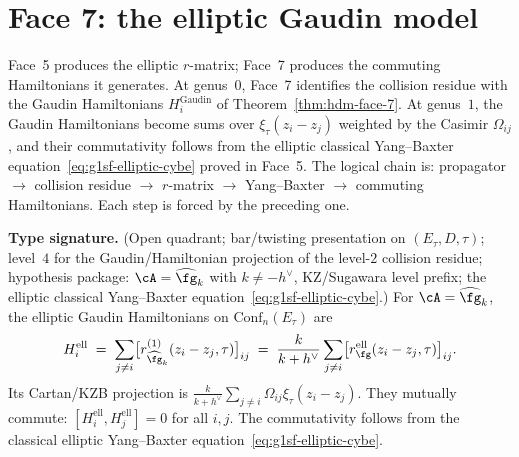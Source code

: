 
\section{Face 7: the elliptic Gaudin model}
\label{sec:g1sf-face-7}

Face~5 produces the elliptic $r$-matrix; Face~7 produces the
commuting Hamiltonians it generates. At genus~$0$, Face~7 identifies
the collision residue with the Gaudin Hamiltonians
$H_i^{\mathrm{Gaudin}}$ of Theorem~\ref{thm:hdm-face-7}. At
genus~$1$, the Gaudin Hamiltonians become sums over
$\xi_\tau(z_i - z_j)$ weighted by the Casimir $\Omega_{ij}$, and
their commutativity follows from the elliptic classical Yang--Baxter
equation~\eqref{eq:g1sf-elliptic-cybe} proved in Face~5. The logical
chain is: propagator $\to$ collision residue $\to$ $r$-matrix $\to$
Yang--Baxter $\to$ commuting Hamiltonians. Each step is forced by the
preceding one.

\begin{theorem}
\label{thm:g1sf-face-7}
\textbf{Type signature.} (Open quadrant; bar/twisting presentation on
$(E_\tau, D, \tau)$; level~$4$ for the Gaudin/Hamiltonian projection
of the level-$2$ collision residue; hypothesis package:
$\cA = \widehat{\fg}_k$ with $k\neq -h^\vee$,
KZ/Sugawara level prefix; the elliptic classical Yang--Baxter
equation~\eqref{eq:g1sf-elliptic-cybe}.)
For $\cA = \widehat{\fg}_k$, the elliptic Gaudin Hamiltonians on
$\mathrm{Conf}_n(E_\tau)$ are
\begin{equation}\label{eq:g1sf-elliptic-gaudin}
H_i^{\mathrm{ell}}
\;=\;
\sum_{j \neq i}
\bigl[r_{\widehat{\fg}_k}^{(1)}(z_i - z_j, \tau)\bigr]_{ij}
\;=\;
\frac{k}{k+h^\vee}
\sum_{j \neq i}
\bigl[r^{\mathrm{ell}}_\fg(z_i-z_j,\tau)\bigr]_{ij}.
\end{equation}
Its Cartan/KZB projection is
$\frac{k}{k+h^\vee}\sum_{j\neq i}\Omega_{ij}\xi_\tau(z_i-z_j)$.
They mutually commute:
$[H_i^{\mathrm{ell}}, H_j^{\mathrm{ell}}] = 0$ for all $i, j$.
The commutativity follows from the classical elliptic Yang--Baxter
equation~\eqref{eq:g1sf-elliptic-cybe}.
\end{theorem}

